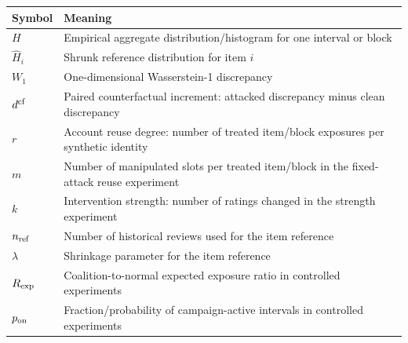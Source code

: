 \begin{tabular}{ll}
\toprule
Symbol & Meaning \\
\midrule
$H$ & Empirical aggregate distribution/histogram for one interval or block \\
$\widehat H_i$ & Shrunk reference distribution for item $i$ \\
$W_1$ & One-dimensional Wasserstein-1 discrepancy \\
$d^{\rm cf}$ & Paired counterfactual increment: attacked discrepancy minus clean discrepancy \\
$r$ & Account reuse degree: number of treated item/block exposures per synthetic identity \\
$m$ & Number of manipulated slots per treated item/block in the fixed-attack reuse experiment \\
$k$ & Intervention strength: number of ratings changed in the strength experiment \\
$n_{\rm ref}$ & Number of historical reviews used for the item reference \\
$\lambda$ & Shrinkage parameter for the item reference \\
$R_{\rm exp}$ & Coalition-to-normal expected exposure ratio in controlled experiments \\
$p_{\rm on}$ & Fraction/probability of campaign-active intervals in controlled experiments \\
\bottomrule
\end{tabular}
